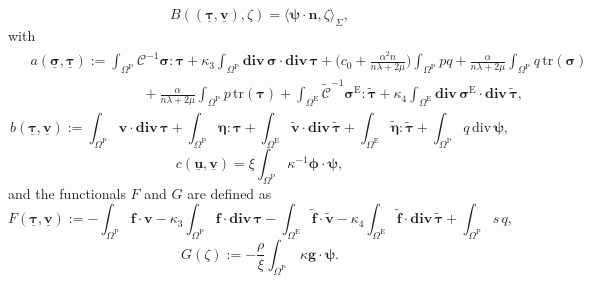 \documentclass[11pt]{article}
\numberwithin{equation}{section}
\def\b{\boldsymbol}
\newcommand\ff{\boldsymbol{f}}
\newcommand\nn{\boldsymbol{n}}
\newcommand\OmP{\Omega^{\mathrm{P}}}
\newcommand\OmE{\Omega^{\mathrm{E}}}
\numberwithin{equation}{section}
\begin{document}
	\begin{equation}
	B((\underline{\b \tau},\underline{\b v}), \zeta) = \langle\b \psi\cdot\nn,\zeta\rangle_{\Sigma},
	\end{equation}
	with
	\begin{align}\label{var-form-A}
	\begin{split}
	& a(\underline{\b \sigma},\underline{\b \tau}):=\int_{\OmP}\mathcal{C}^{-1}\b \sigma\colon\b \tau + \kappa_3\int_{\OmP}\mathbf{div}\, \b \sigma\cdot \mathbf{div}\, \b \tau + \Big(c_0+\frac{\alpha^2n}{n\lambda+2\mu}\Big)\int_{\OmP}p q + \frac{\alpha}{n\lambda+2\mu} \int_{\OmP} q\,\mathrm{tr}(\b \sigma)\\
	&\qquad \qquad\qquad \qquad + \frac{\alpha}{n\lambda+2\mu} \int_{\OmP} p\,\mathrm{tr}(\b \tau) +   \int_{\OmE}\widetilde{\mathcal{C}}^{-1}\b \sigma^{\mathrm{E}}\colon\widetilde{\b \tau} + \kappa_4\int_{\OmE}\mathbf{div}\, \b \sigma^{\mathrm{E}}\cdot \mathbf{div}\, \widetilde{\b \tau},
	\end{split}
	\end{align} 
	\begin{equation}\label{var-form-b}
	b(\underline{\b \tau}, \underline{\b v}):=  \int_{\OmP} \b v \cdot\mathbf{div}\,\b \tau + \int_{\OmP} \b \eta \colon\b \tau+ \int_{\OmE} \widetilde{\b v} \cdot\mathbf{div}\,\widetilde{\b \tau} + \int_{\OmE} \widetilde{\b \eta} \colon\widetilde{\b \tau} + \int_{\OmP} q \,\mathrm{div}\,\b \psi,
	\end{equation}
	\begin{equation}\label{var-form-c}
	c(\underline{\b u},\underline{\b v}) =  \xi\int_{\OmP}\kappa^{-1}\b \phi \cdot\b \psi,
	\end{equation}
	and the functionals $F$ and $G$ are defined as
	\begin{equation}\label{funct-F}
	F(\underline{\b \tau},\underline{\b v}) := -\int_{\OmP} \ff\cdot \b v-\kappa_3\int_{\OmP} \ff\cdot \mathbf{div}\,\b \tau -\int_{\OmE} \widetilde{\ff}\cdot \widetilde{\b v}-\kappa_4\int_{\OmE} \widetilde{\ff}\cdot \mathbf{div}\,\widetilde{\b \tau} + \int_{\OmP}s\,q,
	\end{equation}
	\begin{equation}\label{funct-G}
	G(\zeta) :=  - \frac{\rho}{\xi}\int_{\OmP}\,\kappa\boldsymbol{g}\cdot \b \psi.
	\end{equation}
\end{document}
